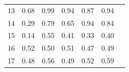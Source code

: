 \documentclass[twoside,11pt]{article}
\begin{document}
\begin{table}[H]
{\begin{tabular}{|c|c|c|c|c|c|c|}
13    & 0.68                                                           & 0.99                                                                                     & 0.94                                                                               & 0.87                                                                               & 0.94                                                                               &                                                                                       \\ \cline{1-1}
14    & 0.29                                                           & 0.79                                                                                     & 0.65                                                                               & 0.94                                                                               & 0.84                                                                               &                                                                                       \\ \cline{1-1}
15    & 0.14                                                           & 0.55                                                                                     & 0.41                                                                               & 0.33                                                                               & 0.40                                                                               &                                                                                       \\ \cline{1-1}
16    & 0.52                                                           & 0.50                                                                                     & 0.51                                                                               & 0.47                                                                               & 0.49                                                                               &                                                                                       \\ \cline{1-1}
17    & 0.48                                                           & 0.56                                                                                     & 0.49                                                                               & 0.52                                                                               & 0.59                                                                               &                                                                                       \\ \cline{1-1}

\end{tabular}}
\end{table}
\end{document}
